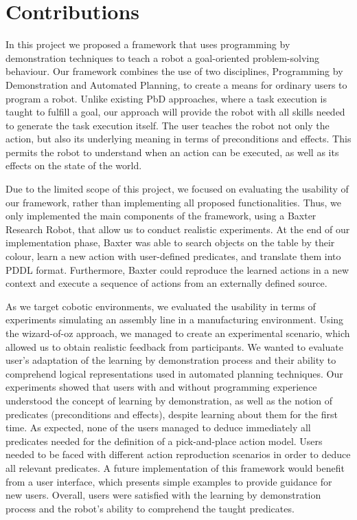 \section{Contributions}
In this project we proposed a framework that uses programming by demonstration techniques to teach a robot a goal-oriented problem-solving behaviour. Our framework combines the use of two disciplines, Programming by Demonstration and Automated Planning, to create a means for ordinary users to program a robot. Unlike existing PbD approaches, where a task execution is taught to fulfill a goal, our approach will provide the robot with all skills needed to generate the task execution itself. The user teaches the robot not only the action, but also its underlying meaning in terms of preconditions and effects. This permits the robot to understand when an action can be executed, as well as its effects on the state of the world. 

Due to the limited scope of this project, we focused on evaluating the usability of our framework, rather than implementing all proposed functionalities. Thus, we only implemented the main components of the framework, using a Baxter Research Robot, that allow us to conduct realistic experiments. At the end of our implementation phase, Baxter was able to search objects on the table by their colour, learn a new action with user-defined predicates, and translate them into PDDL format. Furthermore, Baxter could reproduce the learned actions in a new context and execute a sequence of actions from an externally defined source.

As we target cobotic environments, we evaluated the usability in terms of experiments simulating an assembly line in a manufacturing environment. Using the wizard-of-oz approach, we managed to create an experimental scenario, which allowed us to obtain realistic feedback from participants. We wanted to evaluate user's adaptation of the learning by demonstration process and their ability to comprehend logical representations used in automated planning techniques. Our experiments showed that users with and without programming experience understood the concept of learning by demonstration, as well as the notion of predicates (preconditions and effects), despite learning about them for the first time. As expected, none of the users managed to deduce immediately all predicates needed for the definition of a pick-and-place action model. Users needed to be faced with different action reproduction scenarios in order to deduce all relevant predicates. A future implementation of this framework would benefit from a user interface, which presents simple examples to provide guidance for new users.
Overall, users were satisfied with the learning by demonstration process and the robot's ability to comprehend the taught predicates.

